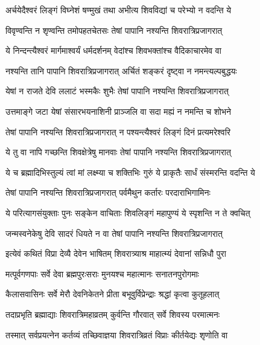 \twolineshloka
{अर्चयेदैश्वरं लिङ्गं विघ्नेशं षण्मुखं तथा}
{अभीत्य शिवविद्यां च परेभ्यो न वदन्ति ये} %

\twolineshloka
{विवृण्वन्ति न शृण्वन्ति तमोपहतचेतसः}
{तेषां पापानि नश्यन्ति शिवरात्रिप्रजागरात्} %

\twolineshloka
{ये निन्दन्त्यैश्वरं मार्गमाश्वर्यं धर्मदर्शनम्}
{वेदांश्च शिवभक्तांश्च वैदिकाचारमेव वा} %

\twolineshloka
{नश्यन्ति तानि\footnotemark{} पापानि शिवरात्रिप्रजागरात्}
{अर्चितं शङ्करं दृष्ट्वा न नमन्त्यल्पबुद्धयः} %


\twolineshloka
{येषां न राजते देवि ललाटं भस्मकैः शुभैः}
{तेषां पापानि नश्यन्ति शिवरात्रिप्रजागरात्} %

\twolineshloka
{उत्तमाङ्गे जटा येषां संसारभयनाशिनी}
{प्राञ्जलि वा सदा मह्यं न नमन्ति च शोभने} %

\twolineshloka
{तेषां पापानि नश्यन्ति शिवरात्रिप्रजागरात्}
{न पश्यन्त्यैश्वरं लिङ्गं दिनं प्रत्यमरेश्वरि} %

\twolineshloka
{ये तु वा नापि गच्छन्ति शिवक्षेत्रेषु मानवाः}
{तेषां पापानि नश्यन्ति शिवरात्रिप्रजागरात्} %

\twolineshloka
{ये च ब्रह्मादिभिस्तुल्यं त्वां मां लक्ष्म्या च शक्तिभिः}
{गुरुं ये प्राकृतैः सार्धं संस्मरन्ति वदन्ति ये} %

\twolineshloka
{तेषां पापानि नश्यन्ति शिवरात्रिप्रजागरात्}
{पर्वमैथुन कर्तारः परदाराभिगामिनः} %

\twolineshloka
{ये परित्यागसंयुक्ताः पुनः सङ्केन वाचिताः}
{शिवलिङ्गं महापुण्यं ये स्पृशन्ति न ते क्वचित्} %

\twolineshloka
{जन्मस्वनेकेषु देवि सादरं धियते न वा}
{तेषां पापानि नश्यन्ति शिवरात्रिप्रजागरात्} %


\twolineshloka
{इत्येवं कथितं विप्रा\footnotemark{} देव्यै देवेन भाषितम्}
{शिवरात्र्याश्र माहात्म्यं देवानां सन्निधौ पुरा} %


\twolineshloka
{मत्पूर्वगणपाः सर्वे देवा ब्रह्मपुरःसराः}
{मुनयश्च महात्मानः सनातनपुरोगमाः} %

\twolineshloka
{कैलासवासिनः सर्वे मेरौ देवनिकेतने}
{प्रीता बभूवुर्विप्रेन्द्राः श्रद्धां कृत्वा कुतूहलात्} %

\twolineshloka
{तदाप्रभृति ब्रह्माद्याः शिवरात्रिमहाव्रतम्}
{कुर्वन्ति गौरवात् सर्वे शिवस्य परमात्मनः} %

\twolineshloka
{तस्मात् सर्वप्रयत्नेन कर्तव्यं तच्छिवाज्ञया}
{शिवरात्रिव्रतं विप्राः\footnotemark{}  कीर्तयेद्यः शृणोति वा} %

